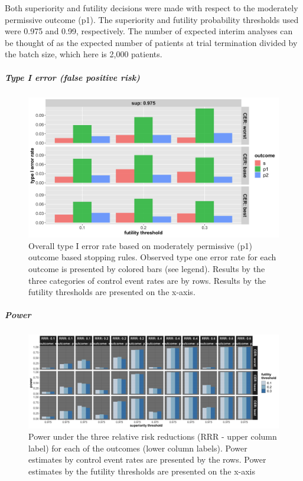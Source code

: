 \documentclass[]{article}
\let\oldsubparagraph\subparagraph
\renewcommand{\subparagraph}[1]{\oldsubparagraph{#1}\mbox{}}
\begin{document}
Both superiority and futility decisions were made with respect to the
moderately permissive outcome (p1). The superiority and futility
probability thresholds used were 0.975 and 0.99, respectively. The
number of expected interim analyses can be thought of as the expected
number of patients at trial termination divided by the batch size, which
here is 2,000 patients.

\hypertarget{type-i-error-false-positive-risk-1}{%
\subparagraph{Type I error (false positive
risk)}\label{type-i-error-false-positive-risk-1}}

\begin{figure}
  \caption{Overall type I error rate based on moderately permissive (p1) outcome based stopping rules. Observed type one error rate for each outcome is
  presented by colored bars (see legend). Results by the three categories of control event rates are by rows. Results by the futility thresholds are
  presented on the x-axis.}
  \includegraphics{../p1_plots/batch_size_nb_2000/type_1_error_p1.png}
\end{figure}

\clearpage

\hypertarget{power-1}{%
\subparagraph{Power}\label{power-1}}

\begin{figure}
  \caption{Power under the three relative risk reductions (RRR - upper column label) for each of the outcomes (lower column labels). 
  Power estimates by control event rates are presented by the rows. Power estimates by the futility thresholds are presented on the x-axis}
  \includegraphics{../p1_plots/batch_size_nb_2000/power_all_p1.png}
\end{figure}
\end{document}
